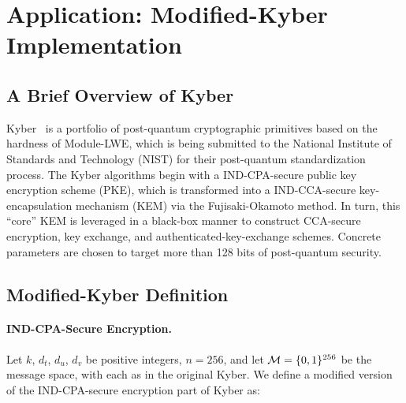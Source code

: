 
\section{Application: Modified-Kyber Implementation}
\label{sec:modif-kyber-inst}

\subsection{A Brief Overview of Kyber}
\label{sec:kyber-intro}

Kyber~\cite{DBLP:journals/iacr/BosDKLLSSS17} is a portfolio of
post-quantum cryptographic primitives based on the hardness of
Module-LWE, which is being submitted to the National Institute of
Standards and Technology (NIST) for their post-quantum standardization
process. The Kyber algorithms begin with a IND-CPA-secure public key encryption scheme (PKE), which is transformed into a IND-CCA-secure key-encapsulation mechanism (KEM) via the Fujisaki-Okamoto method. In turn, this ``core'' KEM is leveraged in a black-box manner to construct CCA-secure encryption, key exchange, and authenticated-key-exchange schemes. Concrete parameters are chosen to target more than 128 bits of post-quantum security.

\subsection{Modified-Kyber Definition}
\label{sec:modif-kyber-defin}

\paragraph{IND-CPA-Secure Encryption.} Let $k$, $d_t$, $d_u$, $d_v$ be positive integers, $n=256$, and let $\mathcal{M} = \{0,1\}^{256}$ be the message space, with each as in the original Kyber. We define a modified version of the IND-CPA-secure encryption part of Kyber as:

